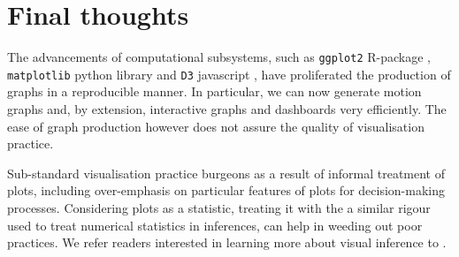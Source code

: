 \documentclass[ijds,nonblindrev]{informs-ijds}
\makeatletter
\renewcommand\st[1]{\@bsphack\@esphack}%
\makeatother
\begin{document}

\section{Final thoughts}\label{sec:conclude}

The advancements of computational subsystems, such as \texttt{ggplot2} R-package \citep{ggplot2}, \texttt{matplotlib} python library \citep{Hunter:2007} and \texttt{D3} javascript \citep{D3}, have proliferated the production of graphs in a reproducible manner. In particular, we can now generate motion graphs and, by extension, interactive graphs and dashboards very efficiently. The ease of graph production however does not assure the quality of visualisation practice.


Sub-standard visualisation practice burgeons as a result of informal treatment of plots, including over-emphasis on particular features of plots for decision-making processes. Considering plots as a statistic, treating it with the a similar rigour used to treat numerical statistics in inferences, can help in weeding out poor practices. We refer readers interested in learning more about visual inference to \cite{vanderplas2020testing}.

\end{document}
